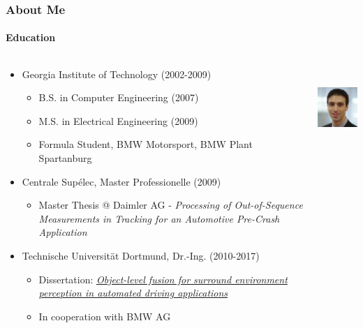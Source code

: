 \begin{frame}[t]
\frametitle{About Me}
\framesubtitle{Education}
\begin{columns}[T]
    \begin{column}{.75\textwidth}
    \begin{itemize}
        \item Georgia Institute of Technology (2002-2009)
        \begin{itemize}
            \item B.S. in Computer Engineering (2007)
            \item M.S. in Electrical Engineering (2009)
            \item Formula Student, BMW Motorsport, BMW Plant Spartanburg
        \end{itemize}
        \item Centrale Sup\'{e}lec, Master Professionelle (2009)
        \begin{itemize}
            \item Master Thesis @ Daimler AG - \emph{Processing of Out-of-Sequence
                Measurements in Tracking for an Automotive Pre-Crash Application}
        \end{itemize}
        \item Technische Universit\"{a}t Dortmund, Dr.-Ing. (2010-2017)
        \begin{itemize}
            \item Dissertation: \emph{\href{https://eldorado.tu-dortmund.de/handle/2003/36011}{Object-level fusion for surround environment perception in automated driving applications}} \cite{AeberhardDissertation}
            \item In cooperation with BMW AG
        \end{itemize}
    \end{itemize}
    \end{column}
    \begin{column}{.25\textwidth}
    \centering
    \includegraphics[height=3cm]{images/michael-aeberhard-profile.jpg} \\
    \end{column}
\end{columns}
\end{frame}

